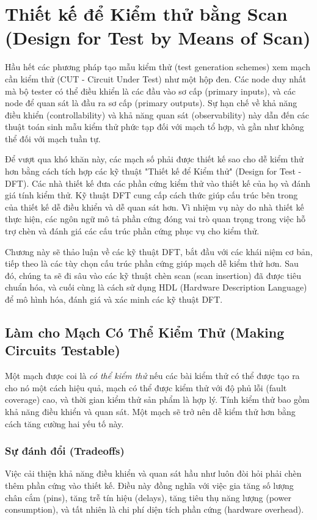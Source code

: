 \section{Thiết kế để Kiểm thử bằng Scan (Design for Test by Means of Scan)}

Hầu hết các phương pháp tạo mẫu kiểm thử (test generation schemes) xem mạch cần kiểm thử (CUT - Circuit Under Test) như một hộp đen. Các node duy nhất mà bộ tester có thể điều khiển là các đầu vào sơ cấp (primary inputs), và các node để quan sát là đầu ra sơ cấp (primary outputs). Sự hạn chế về khả năng điều khiển (controllability) và khả năng quan sát (observability) này dẫn đến các thuật toán sinh mẫu kiểm thử phức tạp đối với mạch tổ hợp, và gần như không thể đối với mạch tuần tự.

Để vượt qua khó khăn này, các mạch số phải được thiết kế sao cho dễ kiểm thử hơn bằng cách tích hợp các kỹ thuật "Thiết kế để Kiểm thử" (Design for Test - DFT). Các nhà thiết kế đưa các phần cứng kiểm thử vào thiết kế của họ và đánh giá tính kiểm thử. Kỹ thuật DFT cung cấp cách thức giúp cấu trúc bên trong của thiết kế dễ điều khiển và dễ quan sát hơn. Vì nhiệm vụ này do nhà thiết kế thực hiện, các ngôn ngữ mô tả phần cứng đóng vai trò quan trọng trong việc hỗ trợ chèn và đánh giá các cấu trúc phần cứng phục vụ cho kiểm thử.

Chương này sẽ thảo luận về các kỹ thuật DFT, bắt đầu với các khái niệm cơ bản, tiếp theo là các tùy chọn cấu trúc phần cứng giúp mạch dễ kiểm thử hơn. Sau đó, chúng ta sẽ đi sâu vào các kỹ thuật chèn scan (scan insertion) đã được tiêu chuẩn hóa, và cuối cùng là cách sử dụng HDL (Hardware Description Language) để mô hình hóa, đánh giá và xác minh các kỹ thuật DFT.

\subsection{Làm cho Mạch Có Thể Kiểm Thử (Making Circuits Testable)}
Một mạch được coi là \textit{có thể kiểm thử} nếu các bài kiểm thử có thể được tạo ra cho nó một cách hiệu quả, mạch có thể được kiểm thử với độ phủ lỗi (fault coverage) cao, và thời gian kiểm thử sản phẩm là hợp lý. Tính kiểm thử bao gồm khả năng điều khiển và quan sát. Một mạch sẽ trở nên dễ kiểm thử hơn bằng cách tăng cường hai yếu tố này.

\subsubsection{Sự đánh đổi (Tradeoffs)}
Việc cải thiện khả năng điều khiển và quan sát hầu như luôn đòi hỏi phải chèn thêm phần cứng vào thiết kế. Điều này đồng nghĩa với việc gia tăng số lượng chân cắm (pins), tăng trễ tín hiệu (delays), tăng tiêu thụ năng lượng (power consumption), và tất nhiên là chi phí diện tích phần cứng (hardware overhead). 

